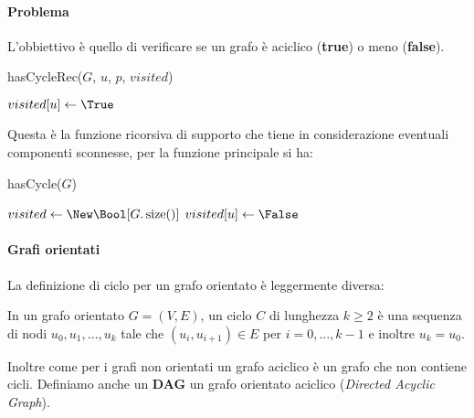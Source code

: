             \paragraph{Problema} L'obbiettivo è quello di verificare se un grafo è aciclico (\textbf{true}) o meno (\textbf{false}).

            \begin{algorithm}[H]
                \label{alg:hasCycleRec}
                \caption{\Bool hasCycleRec(\Graph $G$, \Node $u$, \Node $p$, \Bool[] $visited$)}
                \begin{algorithmic}
                    \State $ visited[u] \gets \True $
                            \State \Return \True
                            \State \Return \True
                        \EndIf
                    \EndFor
                    \State \Return \False
                \end{algorithmic}
            \end{algorithm}
            
            Questa è la funzione ricorsiva di supporto che tiene in considerazione eventuali componenti sconnesse, per la funzione principale si ha:

            \begin{algorithm}[H]
                \caption{\Bool hasCycle(\Graph $G$)}
                \begin{algorithmic}
                    \State \Bool[] $ visited \gets \New \Bool[G.\operatorname{size}()] $
                        \State $ visited[u] \gets \False $
                    \EndFor
                                \State \Return \True
                            \EndIf
                        \EndIf
                    \EndFor
                    \State \Return \False
                \end{algorithmic}
            \end{algorithm}

            \paragraph{Grafi orientati} La definizione di ciclo per un grafo orientato è leggermente diversa:
            \begin{definition}
                In un grafo orientato $G=(V,E)$, un ciclo $C$ di lunghezza $k\geq2$ è una sequenza di nodi $u_0,u_1,\dots,u_k$ tale che $(u_i,u_{i+1})\in E$ per $i=0,\dots,k-1$ e inoltre $u_k = u_0$.
            \end{definition}
            Inoltre come per i grafi non orientati un grafo aciclico è un grafo che non contiene cicli. Definiamo anche un \textbf{DAG} un grafo orientato aciclico (\textit{Directed Acyclic Graph}).
